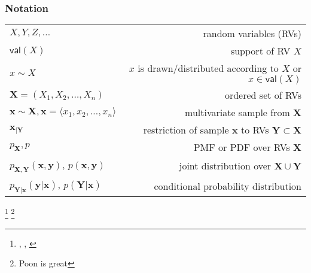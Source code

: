 \documentclass[xcolor={usenames,dvipsnames,svgnames}, compress, aspectratio=169, 11pt]{beamer}
\newcommand{\customcite}[1]{\footnote{\tiny \citeauthor{#1},
    \citetitle{#1}, \citeyear{#1}}}
\begin{document}
\begin{frame}[t]
  \frametitle{Notation}

  \begin{table}[t]
    \begin{tabular}{l r}
    $X, Y, Z, \dots$ & random variables (RVs) \\
    $\mathsf{val}(X)$ & support of RV $X$ \\
    $x\sim X$ & $x$ is drawn/distributed according to $X$ or
    $x\in\mathsf{val}(X)$\\
    $\mathbf{X} = (X_1, X_2, \dots, X_n)$ & ordered set of RVs \\
    $\mathbf{x}\sim \mathbf{X},\mathbf{x}= \langle x_1, x_2, \dots, x_n\rangle$ &
    multivariate sample from $\mathbf{X}$\\
    $\mathbf{x}_{|\mathbf{Y}}$ & restriction of sample $\mathbf{x}$ to
    RVs $\mathbf{Y}\subset\mathbf{X}$ \\
    $p_{\mathbf{X}}, p$ & PMF or PDF over RVs $\mathbf{X}$\\
    $p_{\mathbf{X}, \mathbf{Y}}(\mathbf{x}, \mathbf{y})$, $p(\mathbf{x}, \mathbf{y})$ & joint distribution over $\mathbf{X}\cup\mathbf{Y}$\\
    $p_{\mathbf{Y}| \mathbf{x}}(\mathbf{y}|\mathbf{x})$,
    $p(\mathbf{Y}|\mathbf{x})$ & conditional probability distribution\\
      \end{tabular}
    \end{table}
    \customcite{Poon2011}
    \footnote{Poon is great}
\end{frame}
\end{document}
